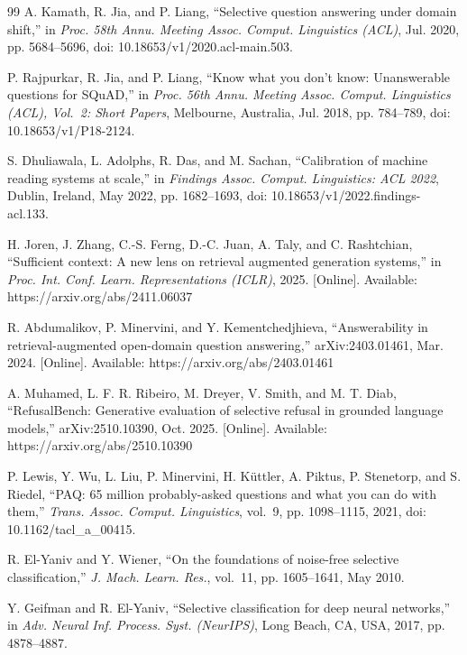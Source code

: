 \documentclass[conference]{IEEEtran}
\begin{document}
\begin{thebibliography}{99}
\footnotesize
{} A. Kamath, R. Jia, and P. Liang, ``Selective question
answering under domain shift,'' in \emph{Proc. 58th Annu. Meeting Assoc. Comput.
Linguistics (ACL)}, Jul. 2020, pp. 5684--5696, doi: 10.18653/v1/2020.acl-main.503.

 P. Rajpurkar, R. Jia, and P. Liang, ``Know what you don't
know: Unanswerable questions for SQuAD,'' in \emph{Proc. 56th Annu. Meeting Assoc.
Comput. Linguistics (ACL), Vol.~2: Short Papers}, Melbourne, Australia, Jul. 2018,
pp. 784--789, doi: 10.18653/v1/P18-2124.

 S. Dhuliawala, L. Adolphs, R. Das, and M. Sachan,
``Calibration of machine reading systems at scale,'' in \emph{Findings Assoc.
Comput. Linguistics: ACL 2022}, Dublin, Ireland, May 2022, pp. 1682--1693,
doi: 10.18653/v1/2022.findings-acl.133.

 H. Joren, J. Zhang, C.-S. Ferng, D.-C. Juan, A. Taly, and
C. Rashtchian, ``Sufficient context: A new lens on retrieval augmented generation
systems,'' in \emph{Proc. Int. Conf. Learn. Representations (ICLR)}, 2025.
[Online]. Available: https://arxiv.org/abs/2411.06037

 R. Abdumalikov, P. Minervini, and Y. Kementchedjhieva,
``Answerability in retrieval-augmented open-domain question answering,''
arXiv:2403.01461, Mar. 2024. [Online]. Available: https://arxiv.org/abs/2403.01461

 A. Muhamed, L. F. R. Ribeiro, M. Dreyer, V. Smith, and
M. T. Diab, ``RefusalBench: Generative evaluation of selective refusal in grounded
language models,'' arXiv:2510.10390, Oct. 2025. [Online]. Available:
https://arxiv.org/abs/2510.10390

 P. Lewis, Y. Wu, L. Liu, P. Minervini, H. K\"uttler,
A. Piktus, P. Stenetorp, and S. Riedel, ``PAQ: 65 million probably-asked questions
and what you can do with them,'' \emph{Trans. Assoc. Comput. Linguistics}, vol.~9,
pp. 1098--1115, 2021, doi: 10.1162/tacl\_a\_00415.

 R. El-Yaniv and Y. Wiener, ``On the foundations of
noise-free selective classification,'' \emph{J. Mach. Learn. Res.}, vol.~11,
pp. 1605--1641, May 2010.

 Y. Geifman and R. El-Yaniv, ``Selective classification for
deep neural networks,'' in \emph{Adv. Neural Inf. Process. Syst. (NeurIPS)}, Long
Beach, CA, USA, 2017, pp. 4878--4887.


\end{thebibliography}
\end{document}
